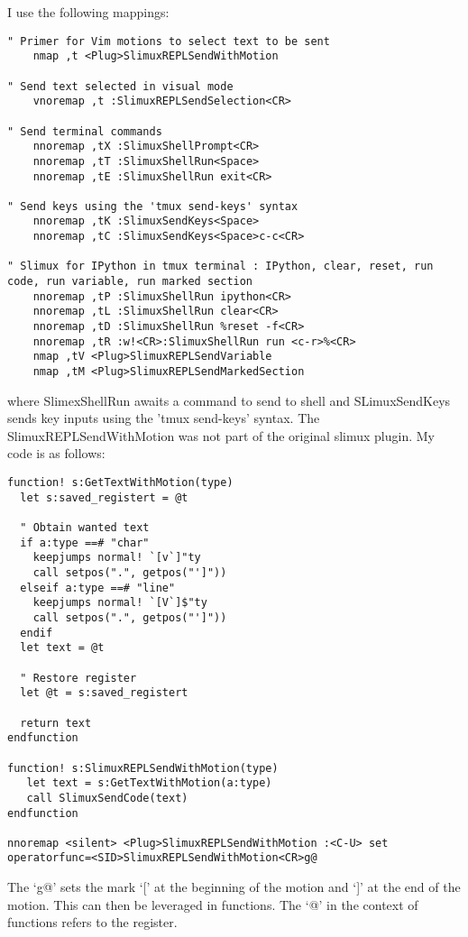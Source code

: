 \documentclass[10pt]{article}
\begin{document}
I use the following mappings:
\begin{lstlisting}
" Primer for Vim motions to select text to be sent
    nmap ,t <Plug>SlimuxREPLSendWithMotion

" Send text selected in visual mode
    vnoremap ,t :SlimuxREPLSendSelection<CR>

" Send terminal commands
    nnoremap ,tX :SlimuxShellPrompt<CR>
    nnoremap ,tT :SlimuxShellRun<Space>
    nnoremap ,tE :SlimuxShellRun exit<CR>

" Send keys using the 'tmux send-keys' syntax
    nnoremap ,tK :SlimuxSendKeys<Space>
    nnoremap ,tC :SlimuxSendKeys<Space>c-c<CR>

" Slimux for IPython in tmux terminal : IPython, clear, reset, run code, run variable, run marked section
    nnoremap ,tP :SlimuxShellRun ipython<CR>
    nnoremap ,tL :SlimuxShellRun clear<CR>
    nnoremap ,tD :SlimuxShellRun %reset -f<CR>
    nnoremap ,tR :w!<CR>:SlimuxShellRun run <c-r>%<CR>
    nmap ,tV <Plug>SlimuxREPLSendVariable
    nmap ,tM <Plug>SlimuxREPLSendMarkedSection
\end{lstlisting}
where SlimexShellRun awaits a command to send to shell and SLimuxSendKeys sends
key inputs using the 'tmux send-keys' syntax. The SlimuxREPLSendWithMotion was
not part of the original slimux plugin. My code is as follows:
\begin{lstlisting}
function! s:GetTextWithMotion(type)
  let s:saved_registert = @t

  " Obtain wanted text
  if a:type ==# "char"
    keepjumps normal! `[v`]"ty
    call setpos(".", getpos("']"))
  elseif a:type ==# "line"
    keepjumps normal! `[V`]$"ty
    call setpos(".", getpos("']"))
  endif
  let text = @t

  " Restore register
  let @t = s:saved_registert

  return text
endfunction

function! s:SlimuxREPLSendWithMotion(type)
   let text = s:GetTextWithMotion(a:type)
   call SlimuxSendCode(text)
endfunction

nnoremap <silent> <Plug>SlimuxREPLSendWithMotion :<C-U> set operatorfunc=<SID>SlimuxREPLSendWithMotion<CR>g@
\end{lstlisting}
The `g@' sets the mark `[' at the beginning of the motion and `]' at the end of
the motion. This can then be leveraged in functions. The `@' in the context of
functions refers to the register.

\end{document}
